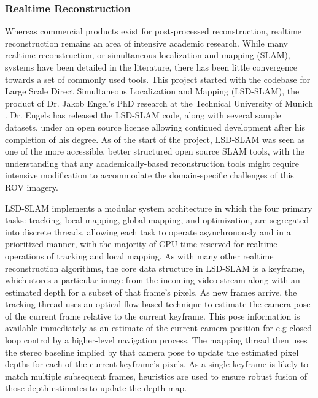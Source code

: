 \documentclass[letterpaper,12pt]{article}
\begin{document}
\clearpage
\subsubsection{Realtime Reconstruction}

Whereas commercial products exist for post-processed reconstruction, realtime reconstruction remains an area of intensive academic research.   While many realtime reconstruction, or simultaneous localization and mapping (SLAM), systems have been detailed in the literature, there has been little convergence towards a set of commonly used tools.   This project started with the codebase for Large Scale Direct Simultaneous Localization and Mapping (LSD-SLAM), the product of Dr. Jakob Engel's PhD research at the Technical University of Munich \cite{engel2014lsd}.   Dr. Engels has released the LSD-SLAM code, along with several sample datasets, under an open source license allowing continued development after his completion of his degree.   As of the start of the project, LSD-SLAM was seen as one of the more accessible, better structured open source SLAM tools, with the understanding that any academically-based reconstruction tools might require intensive modification to accommodate the domain-specific challenges of this ROV imagery.

LSD-SLAM implements a modular system architecture in which the four primary tasks: tracking, local mapping, global mapping, and optimization, are segregated into discrete threads, allowing each task to operate asynchronously and in a prioritized manner, with the majority of CPU time reserved for realtime operations of tracking and local mapping.   As with many other realtime reconstruction algorithms, the core data structure in LSD-SLAM is a keyframe, which stores a particular image from the incoming video stream along with an estimated depth for a subset of that frame's pixels.   As new frames arrive, the tracking thread uses an optical-flow-based technique to estimate the camera pose of the current frame relative to the current keyframe.  This pose information is available immediately as an estimate of the current camera position for e.g closed loop control by a higher-level navigation process.  The mapping thread then uses the stereo baseline implied by that camera pose to update the estimated pixel depths for each of the current keyframe's pixels.   As a single keyframe is likely to match multiple subsequent frames, heuristics are used to ensure robust fusion of those depth estimates to update the depth map.
\end{document}
